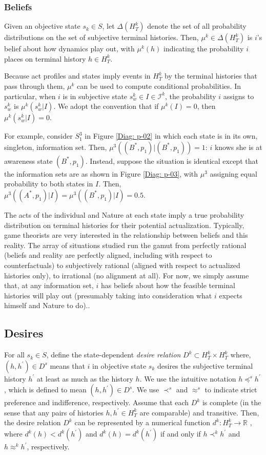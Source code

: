 \documentclass[
11pt,
titlepage,
reqno,
]{article}%
\theoremstyle{definition}
\begin{document}
\subsubsection{Beliefs} \label{sec: beliefs}
Given an objective state $s_k\in S$, let $\Delta(H^k_T)$ denote the set of all probability distributions on the set of subjective terminal histories. 
Then,  $\mu^k\in \Delta(H^k_T)$  is $i$'s belief about how dynamics play out, with $\mu^k(h)$ indicating the probability $i$ places on terminal history $h\in H^k_T$. 

Because act profiles and states imply events in $H^k_T$ by the terminal histories that pass through them, $\mu^k$ can be used to compute conditional probabilities.
In particular, when $i$ is in subjective state $s^k_w\in I\in\mathcal{I}^k$, the probability $i$ assigns to $s^k_w$ is  $\mu^k(s^k_w|I)$.
We adopt the convention that if  $\mu^k(I)=0$, then  $\mu^k(s^k_w|I)=0$.

For example, consider $S^3_1$ in Figure \ref{Diag: p-02} in which each state is in its own, singleton, information set.
Then,  $\mu^{3}((B^\ast,p_1)|(B^\ast,p_1))=1$: $i$ knows she is at awareness state $(B^\ast,p_1)$.
Instead, suppose the situation is identical except that the information sets are as shown in Figure \ref{Diag: p-03}, with $\mu^{3}$ assigning equal probability to both states in $I$.
Then, $\mu^{3}((A^\ast,p_1)|I)=\mu^{3}((B^\ast,p_1)|I)=0.5$.
 
The acts of the individual and Nature at each state imply a true probability distribution on terminal histories for their potential actualization. 
Typically, game theorists are very interested in the relationship between beliefs and this reality.
The array of situations studied run the gamut from perfectly rational (beliefs and reality are perfectly aligned, including with respect to counterfactuals) to subjectively rational (aligned with respect to actualized histories only), to irrational (no alignment at all).
For now, we simply assume that, at any information set, $i$ has beliefs about how the feasible terminal histories will play out (presumably taking into consideration what $i$ expects himself and Nature to do)..



\subsection{Desires} \label{sec: desires}
For all $s_k\in S$, define the state-dependent \textit{desire relation}    $D^k\subset H^k_T\times H^k_T$ where, $(h,h^{\prime})\in D^s$ means that  $i$ in objective state $s_k$ desires the subjective terminal history $h^{\prime}$ at least as much as the history $h$. 
We use the intuitive notation $h\preceq^s h^{\prime}$, which is defined to mean $(h,h^{\prime})\in D^s$. 
We use $\prec^s$ and $\approx^s$ to indicate strict preference and indifference, respectively. 
Assume that each $D^k$ is complete (in the sense that any pairs of histories $h,h^{\prime}\in H^k_T$ are comparable) and transitive. 
Then, the desire relation $D^k$ can be represented by a numerical function $d^k:H^k_T\rightarrow \mathbb{R}$ , where $d^k(h)< d^k(h^\prime)$ and $d^k(h)= d^k(h^\prime)$ if and only if  $h\prec^k h^{\prime}$ and $h\approx^k h^{\prime}$, respectively.
\end{document}
